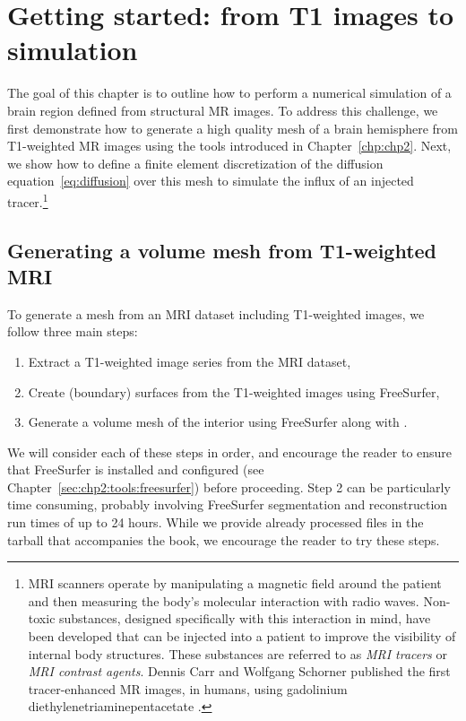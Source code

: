 \chapter{Getting started: from T1 images to simulation}
\label{chp:chp3}

The goal of this chapter is to outline how to perform a numerical
simulation of a brain region defined from structural MR images. To
address this challenge, we first demonstrate how to generate a high
quality mesh of a brain hemisphere from T1-weighted MR images using
the tools introduced in Chapter~\ref{chp:chp2}. Next, we show how to
define a finite element discretization of the diffusion
equation~\eqref{eq:diffusion} over this mesh to simulate the influx of
an injected tracer.\footnote{MRI scanners operate by manipulating a
  magnetic field around the patient and then measuring the body's
  molecular interaction with radio waves. Non-toxic substances,
  designed specifically with this interaction in mind, have been
  developed that can be injected into a patient to improve the
  visibility of internal body structures. These substances are
  referred to as \textit{MRI tracers} or \textit{MRI contrast agents}.
  Dennis Carr and Wolfgang Schorner published the first
  tracer-enhanced MR images, in humans, using gadolinium
  diethylenetriaminepentacetate \cite{thomas2013}.}

\section{Generating a volume mesh from T1-weighted MRI}
\label{sec:chp3:tools}

To generate a mesh from an MRI dataset including T1-weighted images,
we follow three main steps:
\begin{enumerate}
\item
  Extract a T1-weighted image series from the MRI dataset,
\item
  Create (boundary) surfaces from the T1-weighted images using FreeSurfer,
\item
  Generate a volume mesh of the interior using FreeSurfer along with \svmtk.
\end{enumerate}
We will consider each of these steps in order, and encourage the
reader to ensure that FreeSurfer is installed and configured (see
Chapter~\ref{sec:chp2:tools:freesurfer}) before proceeding. Step 2 can
be particularly time consuming, probably involving FreeSurfer segmentation
and reconstruction run times of up to 24 hours.
While we provide already processed files in the tarball that accompanies
the book, we encourage the reader to try these steps.
 
